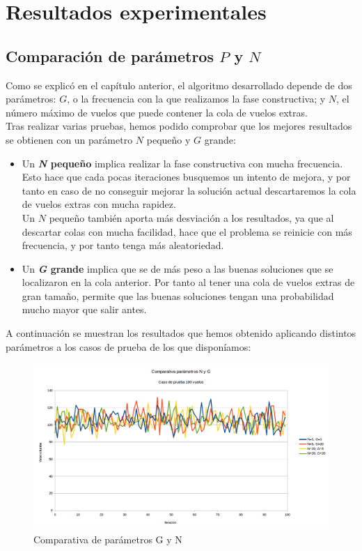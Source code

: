 \chapter{Resultados experimentales}

\section{Comparación de parámetros $P$ y $N$}
Como se explicó en el capítulo anterior, el algoritmo desarrollado depende de dos parámetros: $G$, o la frecuencia con la que realizamos la fase constructiva; y $N$, el número máximo de vuelos que puede contener la cola de vuelos extras.\\
Tras realizar varias pruebas, hemos podido comprobar que los mejores resultados se obtienen con un parámetro $N$ pequeño y $G$ grande:
\begin{itemize}
	\item Un \textbf{\textit{N} pequeño} implica realizar la fase constructiva con mucha frecuencia. Esto hace que cada pocas iteraciones busquemos un intento de mejora, y por tanto en caso de no conseguir mejorar la solución actual descartaremos la cola de vuelos extras con mucha rapidez.\\
	Un $N$ pequeño también aporta más desviación a los resultados, ya que al descartar colas con mucha facilidad, hace que el problema se reinicie con más frecuencia, y por tanto tenga más aleatoriedad. 
	
	\item Un \textbf{\textit{G} grande} implica que se de más peso a las buenas soluciones que se localizaron en la cola anterior. Por tanto al tener una cola de vuelos extras de gran tamaño, permite que las buenas soluciones tengan una probabilidad mucho mayor que salir antes.
\end{itemize} 

A continuación se muestran los resultados que hemos obtenido aplicando distintos parámetros a los casos de prueba de los que disponíamos:

\begin{figure}[H]
	\begin{center}
		\centering
		\includegraphics[width=1\textwidth]{./imagenes/heuristico/comparativa_parametros_100_vuelos.png}
		\caption{Comparativa de parámetros G y N}
		\label{fig: Comparativa de parámetros G y N}
	\end{center}
\end{figure}


